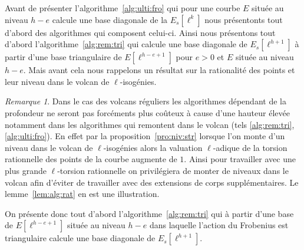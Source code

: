 \documentclass[10pt,a4paper]{book}
\theoremstyle{plain}
\theoremstyle{definition}
\theoremstyle{definition}
\theoremstyle{definition}
\newtheorem{prop}[thm]{Proposition}
\theoremstyle{definition}
\theoremstyle{remark}
\newtheorem{rem}[thm]{Remarque}
\theoremstyle{remark}
\theoremstyle{definition}
\begin{document}
Avant de présenter l'algorithme~\ref{alg:ulti:fro} qui pour une courbe $E$ 
située au niveau $h-e$ calcule une base diagonale de la $E_s[\ell^k]$ nous 
présentonts tout d'abord des algorithmes qui composent celui-ci.
Ainsi nous présentons tout d'abord l'algorithme~\ref{alg:rem:tri} qui calcule
une base diagonale de $E_s[\ell^{h+1}]$ à partir d'une base triangulaire de 
$E[\ell^{h-e+1}]$ pour $e>0$ et $E$ située au niveau $h-e$. Mais avant cela 
nous rappelons un résultat sur la rationalité des points et leur niveau dans le
volcan de $\ell$-isogénies.
%



\begin{rem}
\label{rem:rat:niv:vol}
Dans le cas des volcans réguliers les algorithmes dépendant de la profondeur  
ne seront pas forcéments plus coûteux à cause d'une
hauteur élevée notamment dans les algorithmes qui remontent dans le volcan 
(tels \ref{alg:rem:tri}, \ref{alg:ulti:fro}). En effet par la 
proposition~\ref{pro:niv:str} lorsque l'on monte d'un niveau dans
le volcan de $\ell$-isogénies alors la valuation $\ell$-adique de la torsion
rationnelle des points de la courbe augmente de $1$. Ainsi pour travailler avec
une plus grande $\ell$-torsion rationnelle on privilégiera de monter de niveaux 
dans le volcan afin d'éviter de travailler avec des extensions de corps 
supplémentaires. Le lemme~\ref{lem:alg:rat} en est une illustration.
\end{rem}


On présente donc tout d'abord l'algorithme~\ref{alg:rem:tri} 
qui à partir d'une base de $E[\ell^{h-e+1}]$ située au niveau $h-e$ dans 
laquelle l'action du Frobenius est triangulaire calcule une base diagonale de 
$E_s[\ell^{h+1}]$.
\end{document}
